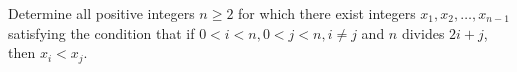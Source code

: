 Determine all positive integers $n\geq 2$ for which there exist integers $x_1,x_2,\ldots ,x_{n-1}$ satisfying the condition that if $0<i<n,0<j<n, i\neq j$ and $n$ divides $2i+j$, then $x_i<x_j$.